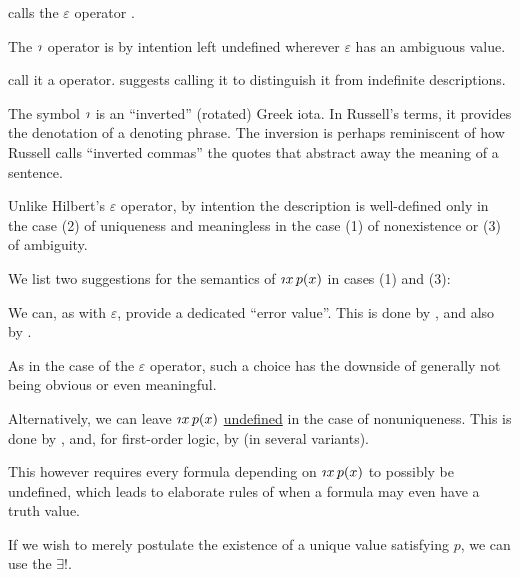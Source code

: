 \begin{concept}
\begin{thmenum}
     calls the \( \varepsilon \) operator .

     The \( \rotiota \) operator is by intention left undefined wherever \( \varepsilon \) has an ambiguous value.

     call it a  operator.  suggests calling it  to distinguish it from indefinite descriptions.

    The symbol \( \rotiota \) is an \enquote{inverted} (rotated) Greek iota. In Russell's terms, it provides the denotation of a denoting phrase. The inversion is perhaps reminiscent of how Russell calls \enquote{inverted commas} the quotes that abstract away the meaning of a sentence.

    Unlike Hilbert's \( \varepsilon \) operator, by intention the description is well-defined only in the case (2) of uniqueness and meaningless in the case (1) of nonexistence or (3) of ambiguity.

    We list two suggestions for the semantics of  \( \quantifier \rotiota x p(x) \) in cases (1) and (3):
    \begin{thmenum}
       We can, as with \( \varepsilon \), provide a dedicated \enquote{error value}. This is done by , and also by .

      As in the case of the \( \varepsilon \) operator, such a choice has the downside of generally not being obvious or even meaningful.

       Alternatively, we can leave \( \quantifier \rotiota x p(x) \) \hyperref[con:undefinedness]{undefined} in the case of nonuniqueness. This is done by , and, for first-order logic, by  (in several variants).

      This however requires every formula depending on \( \quantifier \rotiota x p(x) \) to possibly be undefined, which leads to elaborate rules of when a formula may even have a truth value.
    \end{thmenum}

     If we wish to merely postulate the existence of a unique value satisfying \( p \), we can use the  \( \exists ! \).


\end{thmenum}
\end{concept}
